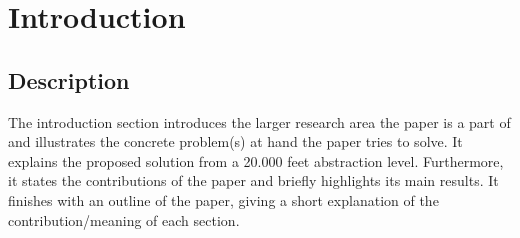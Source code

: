 \section{Introduction}
\subsection{Description}
The introduction section introduces the larger research area
the paper is a part of and illustrates the concrete problem(s) at
hand the paper tries to solve. It explains the proposed solution
from a 20.000 feet abstraction level. Furthermore, it states
the contributions of the paper and briefly highlights its main
results. It finishes with an outline of the paper, giving a short
explanation of the contribution/meaning of each section.
